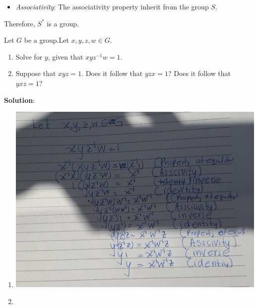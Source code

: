 \documentclass[
]{book}
\providecommand{\tightlist}{%
  \setlength{\itemsep}{0pt}\setlength{\parskip}{0pt}}
\begin{document}
\begin{itemize}
\tightlist
\item
  \emph{Associativity}: The associativity property inherit from the
  group \(S\).
\end{itemize}

Therefore, \(S^*\) is a group.

\leavevmode{}%
Let \(G\) be a group.Let \(x, y, z,w \in G\).

\begin{enumerate}
\def\labelenumi{(\alph{enumi})}
\tightlist
\item
  Solve for \(y\), given that \(xyz^{-1}w = 1\).
\item
  Suppose that \(xyz = 1\). Does it follow that \(yzx = 1\)? Does it
  follow that \(yxz = 1\)?
\end{enumerate}

\textbf{Solution}:

\begin{enumerate}
\def\labelenumi{\alph{enumi}.}
\tightlist
\item
  \hfill\break
  \includegraphics{figures/ch_2/fig17.jpg}
\item
  \hfill\break
\end{enumerate}
\end{document}
